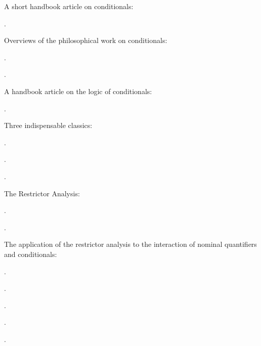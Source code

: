 {}

{\setlength{\parindent}{0pt}\setlength{\parskip}{6pt}

A short handbook article on conditionals:
\begin{bibentrylist}
	\item{}.
\end{bibentrylist}

Overviews of the philosophical work on conditionals:
\begin{bibentrylist}
	\item {}.
	\item {}.
\end{bibentrylist}

A handbook article on the logic of conditionals:
\begin{bibentrylist}
	\item {}.
\end{bibentrylist}

Three indispensable classics:
\begin{bibentrylist}
	\item {}.
	\item {}.
	\item {}. 
\end{bibentrylist}

The Restrictor Analysis:
\begin{bibentrylist}
	\item {}. 
	\item {}.
\end{bibentrylist}

The application of the restrictor analysis to the interaction of nominal quantifiers and conditionals:
\begin{bibentrylist}
	\item {}.
	\item {}.
	\item {}.
	\item {}.
	\item {}.
\end{bibentrylist}

}
